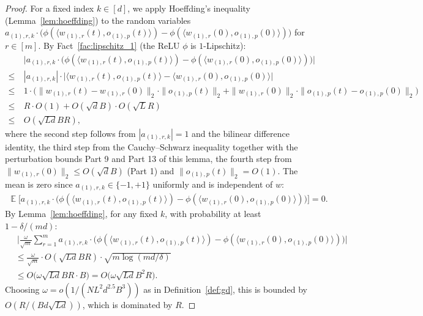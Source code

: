 \documentclass[11pt]{article}
\theoremstyle{plain}
\DeclareMathOperator*{\E}{{\mathbb{E}}}
\begin{document}
\begin{proof}
    For a fixed index $k \in [d]$, we apply Hoeffding's inequality (Lemma~\ref{lem:hoeffding}) to the random variables $a_{(1), r, k} \cdot \big(\phi(\langle w_{(1), r}(t), o_{(1), p}(t) \rangle) - \phi(\langle w_{(1), r}(0), o_{(1), p}(0) \rangle)\big)$ for $r \in [m]$. By Fact~\ref{fac:lipschitz_1} (the ReLU $\phi$ is $1$-Lipschitz):
    \begin{align*}
        & ~ \big| a_{(1), r, k} \cdot \big(\phi(\langle w_{(1), r}(t), o_{(1), p}(t) \rangle) - \phi(\langle w_{(1), r}(0), o_{(1), p}(0) \rangle)\big) \big| \\
        \leq & ~ |a_{(1), r, k}| \cdot \big| \langle w_{(1), r}(t), o_{(1), p}(t) \rangle - \langle w_{(1), r}(0), o_{(1), p}(0) \rangle \big| \\
        \leq & ~ 1 \cdot \big( \| w_{(1), r}(t) - w_{(1), r}(0) \|_2 \cdot \| o_{(1), p}(t) \|_2 + \| w_{(1), r}(0) \|_2 \cdot \| o_{(1), p}(t) - o_{(1), p}(0) \|_2 \big) \\
        \leq & ~ R \cdot O(1) + O(\sqrt{d} B) \cdot O(\sqrt{L} R) \\
        \leq & ~ O(\sqrt{Ld}BR),
    \end{align*}
    where the second step follows from $|a_{(1),r,k}|=1$ and the bilinear difference identity, the third step from the Cauchy--Schwarz inequality together with the perturbation bounds Part 9 and Part 13 of this lemma, the fourth step from $\|w_{(1),r}(0)\|_2\leq O(\sqrt{d}B)$ (Part 1) and $\|o_{(1),p}(t)\|_2 = O(1)$. The mean is zero since $a_{(1), r, k} \in \{-1,+1\}$ uniformly and is independent of $w$:
    \begin{align*}
         \E\big[a_{(1), r, k} \cdot \big( \phi(\langle w_{(1), r}(t), o_{(1), p}(t) \rangle) - \phi(\langle w_{(1), r}(0), o_{(1), p}(0) \rangle)\big)\big] =  0.
    \end{align*}
    By Lemma~\ref{lem:hoeffding}, for any fixed $k$, with probability at least $1 - \delta/(md)$:
    \begin{align*}
        &  ~ \Big| \frac{\omega}{\sqrt{m}} \sum_{r=1}^m a_{(1), r, k} \cdot \big(\phi(\langle w_{(1), r}(t), o_{(1), p}(t) \rangle) - \phi(\langle w_{(1), r}(0), o_{(1), p}(0) \rangle)\big) \Big| \\
        & \leq \frac{\omega}{\sqrt{m}}\cdot O(\sqrt{Ld}BR)\cdot\sqrt{m\log(md/\delta)} \\
        & \leq O\Big(\omega \sqrt{Ld}BR\cdot B\Big) = O\big(\omega \sqrt{Ld}B^2R\big).
    \end{align*}
    Choosing $\omega = o(1/(NL^2d^{2.5}B^3))$ as in Definition~\ref{def:gd}, this is bounded by $O(R/(Bd\sqrt{Ld}))$, which is dominated by $R$.


\end{proof}
\end{document}
